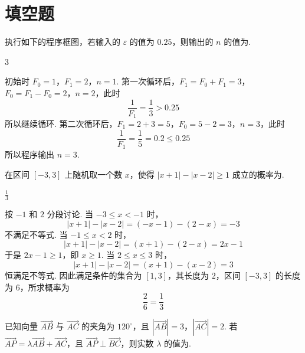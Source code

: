 \section{填空题}

\begin{problem}
执行如下的程序框图，若输入的 \(\varepsilon\) 的值为 \(0.25\)，则输出的 \(n\) 的值为\fillinblank{}.

\end{problem}

\FloatBarrier

\begin{answer}
3
\end{answer}

\begin{solution}
初始时 \(F_0=1\)，\(F_1=2\)，\(n=1\). 第一次循环后，\(F_1=F_0+F_1=3\)，\(F_0=F_1-F_0=2\)，\(n=2\)，此时
\[
\frac{1}{F_1}=\frac{1}{3}>0.25
\]
所以继续循环. 第二次循环后，\(F_1=2+3=5\)，\(F_0=5-2=3\)，\(n=3\)，此时
\[
\frac{1}{F_1}=\frac{1}{5}=0.2\leq0.25
\]
所以程序输出 \(n=3\).
\end{solution}

\begin{problem}
在区间 \([-3,3]\) 上随机取一个数 \(x\)，使得 \(|x + 1| - |x - 2| \geqslant 1\) 成立的概率为\fillinblank{}.
\end{problem}

\begin{answer}
\(\frac{1}{3}\)
\end{answer}

\begin{solution}
按 \(-1\) 和 \(2\) 分段讨论. 当 \(-3\leq x<-1\) 时，
\[
|x+1|-|x-2|=(-x-1)-(2-x)=-3
\]
不满足不等式. 当 \(-1\leq x<2\) 时，
\[
|x+1|-|x-2|=(x+1)-(2-x)=2x-1
\]
于是 \(2x-1\geq1\)，即 \(x\geq1\). 当 \(2\leq x\leq3\) 时，
\[
|x+1|-|x-2|=(x+1)-(x-2)=3
\]
恒满足不等式. 因此满足条件的集合为 \([1,3]\)，其长度为 \(2\)，区间 \([-3,3]\) 的长度为 \(6\)，所求概率为
\[
\frac{2}{6}=\frac{1}{3}
\]
\end{solution}

\begin{problem}
已知向量 \(\overrightarrow{AB}\) 与 \(\overrightarrow{AC}\) 的夹角为 \(120^\circ\)，且 \(|\overrightarrow{AB}| = 3\)，\(|\overrightarrow{AC}| = 2\). 若 \(\overrightarrow{AP} = \lambda\overrightarrow{AB} + \overrightarrow{AC}\)，且 \(\overrightarrow{AP} \perp \overrightarrow{BC}\)，则实数 \(\lambda\) 的值为\fillinblank{}.
\end{problem}

